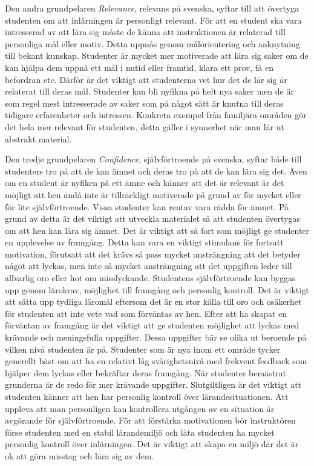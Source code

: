 \documentclass[]{article}
\begin{document}
Den andra grundpelaren \textit{Relevance}, relevans på svenska, syftar till att övertyga studenten om att 
inlärningen är personligt relevant. För att en student ska vara intresserad av att lära sig måste de 
känna att instruktionen är relaterad till personliga mål eller motiv. Detta uppnås genom målorientering 
och anknytning till bekant kunskap. Studenter är mycket mer motiverade att lära sig saker om de kan 
hjälpa dem uppnå ett mål i nutid eller framtid, klara ett prov, få en befordran etc. Därför är det 
viktigt att studenterna vet hur det de lär sig är relaterat till deras mål. Studenter kan bli nyfikna 
på helt nya saker men de är som regel mest intresserade av saker som på något sätt är knutna till deras 
tidigare erfarenheter och intressen. Konkreta exempel från familjära områden gör det hela mer relevant 
för studenten, detta gäller i synnerhet när man lär ut abstrakt material. 

Den tredje grundpelaren \textit{Confidence}, självförtroende på svenska, syftar både till studenters tro på att de 
kan ämnet och deras tro på att de kan lära sig det. Även om en student är nyfiken på ett ämne och känner 
att det är relevant är det möjligt att hen ändå inte är tillräckligt motiverade på grund av för mycket 
eller för lite självförtroende. Vissa studenter kan rentav vara rädda för ämnet. På grund av detta är det 
viktigt att utveckla materialet så att studenten övertygas om att hen kan lära sig ämnet. Det är viktigt 
att så fort som möjligt ge studenter en upplevelse av framgång. Detta kan vara en viktigt stimulans för 
fortsatt motivation, förutsatt att det krävs så pass mycket ansträngning att det betyder något att lyckas, 
men inte så mycket ansträngning att det uppgiften leder till allvarlig oro eller hot om misslyckande. 
Studentens självförtroende kan byggas upp genom lärokrav, möjlighet till framgång och personlig kontroll. 
Det är viktigt att sätta upp tydliga läromål eftersom det är en stor källa till oro och osäkerhet för 
studenten att inte vete vad som förväntas av hen. Efter att ha skapat en förväntan av framgång är det 
viktigt att ge studenten möjlighet att lyckas med krävande och meningsfulla uppgifter. Dessa uppgifter 
bär se olika ut beroende på vilken nivå studenten är på. Studenter som är nya inom ett område tycker 
generellt bäst om att ha en relativt låg svårighetsnivå med frekvent feedback som hjälper dem lyckas 
eller bekräftar deras framgång. När studenter bemästrat grunderna är de redo för mer krävande uppgifter. 
Slutgiltligen är det viktigt att studenten känner att hen har personlig kontroll över lärandesituationen. 
Att uppleva att man personligen kan kontrollera utgången av en situation är avgörande för självförtroende. 
För att förstärka motivationen bör instruktören förse studenten med en stabil lärandemiljö och låta 
studenten ha mycket personlig kontroll över inlärningen. Det är viktigt att skapa en miljö där det är ok 
att göra misstag och lära sig av dem.
\end{document}
